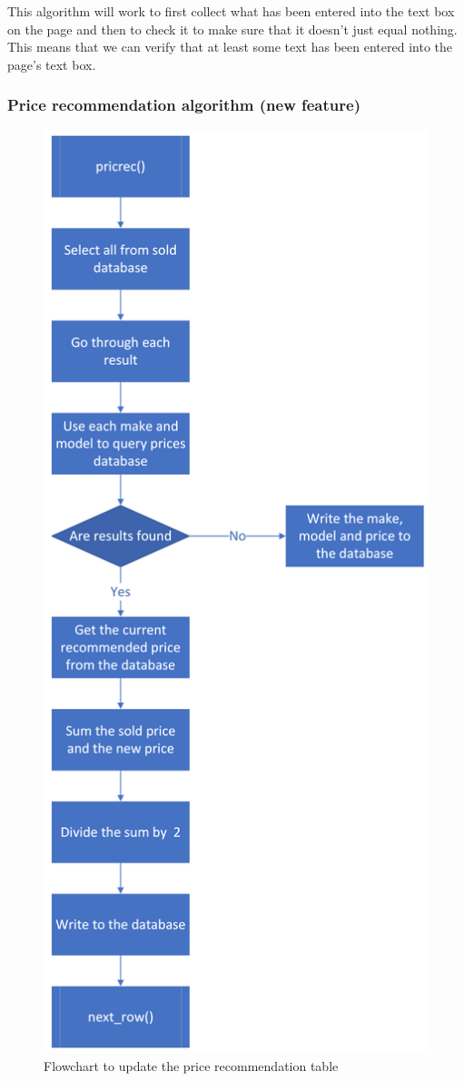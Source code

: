 This algorithm will work to first collect what has been entered into the text box on the page and then to check it to make sure that it doesn’t just equal nothing. This means that we can verify that at least some text has been entered into the page’s text box.

\subsubsection{Price recommendation algorithm (new feature)}
 \begin{figure}[H]
     \centering
     \includegraphics[scale=0.2]{ch3_developing/proto2/proto1_price_flow.png}
     \caption{Flowchart to update the price recommendation table}
     \label{fig:proto1_priceflow}
 \end{figure}
